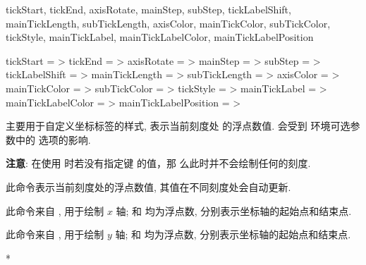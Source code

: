 \documentclass[
  hyper, 
  lang = cn, 
  class = l3doc,
  classOption={11pt},
  sect = {load=false},
]{../../zlatex/code/ztex}
\begin{document}
\begin{keyval}[parent=ztikz/axis]
  {tickStart, tickEnd, axisRotate, mainStep, subStep, 
  tickLabelShift, mainTickLength, subTickLength,
  axisColor, mainTickColor, subTickColor, tickStyle,
  mainTickLabel, mainTickLabelColor, mainTickLabelPosition}
  \begin{syntax}
    tickStart       = >
    tickEnd         = >
    axisRotate      = >
    mainStep        = >
    subStep         = >
    tickLabelShift  = >\dval{0pt}
    mainTickLength  = >\dval{4pt}
    subTickLength   = >\dval{2pt}
    axisColor       = >
    mainTickColor   = >
    subTickColor    = >
    tickStyle       = >
    mainTickLabel   = >
    mainTickLabelColor    = >
    mainTickLabelPosition = >
  \end{syntax}
   主要用于自定义坐标标签的样式,  表示当前刻度处
  的浮点数值.  会受到  环境可选参数中的  
  选项的影响.\par \textbf{注意}: 在使用  时若没有指定键  的值，那
  么此时并不会绘制任何的刻度.
\end{keyval}


\begin{function}[added=2025-05-31]{\CurrentFp}
  此命令表示当前刻度处的浮点数值, 其值在不同刻度处会自动更新.
\end{function}


\begin{function}[added=2025-05-15]{\xAxis}
  \begin{syntax}
  \end{syntax}
  此命令来自 , 用于绘制 $x$ 轴;  和  均为浮点数, 分别表示坐标轴的起始点和结束点.
\end{function}



\begin{function}[added=2025-05-15]{\yAxis}
  \begin{syntax}
  \end{syntax}
  此命令来自 , 用于绘制 $y$ 轴;  和  均为浮点数, 分别表示坐标轴的起始点和结束点.
\end{function}
\begin{DocExample}*
\end{DocExample}
\end{document}
